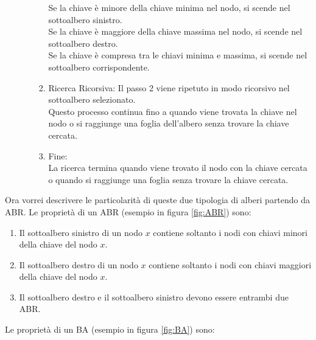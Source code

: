 \begin{itemize}
\begin{itemize}
\begin{enumerate}
                Se la chiave è minore della chiave minima nel nodo, si scende nel sottoalbero sinistro.\\
                Se la chiave è maggiore della chiave massima nel nodo, si scende nel sottoalbero destro.\\
                Se la chiave è compresa tra le chiavi minima e massima, si scende nel sottoalbero corrispondente.
            \item Ricerca Ricorsiva:
                Il passo 2 viene ripetuto in modo ricorsivo nel sottoalbero selezionato.\\
                Questo processo continua fino a quando viene trovata la chiave nel nodo o si raggiunge una foglia dell'albero senza trovare la chiave cercata.
            \item Fine:\\
                La ricerca termina quando viene trovato il nodo con la chiave cercata o quando si raggiunge una foglia senza trovare la chiave cercata.
        \end{enumerate}
    \end{itemize}
\end{itemize}
Ora vorrei descrivere le particolarità di queste due tipologia di alberi partendo da ABR. 
Le proprietà di un ABR (esempio in figura \ref{fig:ABR}) sono:
\begin{enumerate}
    \item Il sottoalbero sinistro di un nodo $x$ contiene soltanto i nodi con chiavi minori della chiave del nodo $x$.
    \item Il sottoalbero destro di un nodo $x$ contiene soltanto i nodi con chiavi maggiori della chiave del nodo $x$.
    \item Il sottoalbero destro e il sottoalbero sinistro devono essere entrambi due ABR.
\end{enumerate}
Le proprietà di un BA (esempio in figura \ref{fig:BA}) sono:

